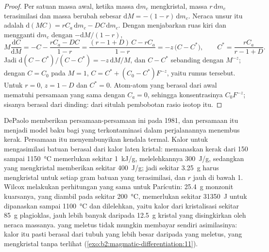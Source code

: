 \begin{proof}
Per satuan massa awal, ketika massa $\mathrm dm_c$ mengkristal, massa
$r\,\mathrm dm_c$ terasimilasi dan massa  berubah sebesar $\mathrm dM =
-(1-r)\,\mathrm dm_c$. Neraca unsur itu adalah $\mathrm d(MC) = rC_a\,\mathrm dm_c -
DC\,\mathrm dm_c$. Dengan menjabarkan ruas kiri dan mengganti $\mathrm dm_c$ dengan
$-\mathrm dM/(1-r)$,
\[
M\frac{\mathrm dC}{\mathrm dM} = -C - \frac{rC_a - DC}{1-r}
= \frac{(r - 1 + D)\,C - rC_a}{1 - r} = -z\,\bigl(C - C^*\bigr),
\qquad C^* = \frac{rC_a}{r - 1 + D}.
\]
Jadi $\mathrm d(C - C^*)/(C - C^*) = -z\,\mathrm dM/M$, dan $C - C^*$ sebanding
dengan $M^{-z}$; dengan $C = C_0$ pada $M = 1$, $C = C^* + (C_0 - C^*)F^{-z}$, yaitu
rumus tersebut. Untuk $r = 0$, $z = 1 - D$ dan $C^* = 0$. Atom-atom yang berasal dari
 awal mematuhi persamaan yang sama dengan $C_a = 0$, sehingga konsentrasinya
$C_0F^{-z}$; sisanya berasal dari dinding: dari situlah pembobotan rasio isotop itu.
\end{proof}

DePaolo memberikan persamaan-persamaan ini pada 1981, dan persamaan itu menjadi model baku bagi 
yang terkontaminasi dalam perjalanannya menembus kerak. Persamaan itu menyembunyikan kendala termal. Kalor
untuk mengasimilasi batuan berasal dari kalor laten kristal: memanaskan kerak dari
150 sampai \qty{1150}{\celsius} memerlukan sekitar \qty{1}{kJ/g}, melelehkannya \qty{300}{J/g},
sedangkan  yang mengkristal memberikan sekitar \qty{400}{J/g}; jadi sekitar \qty{3.25}{g}
 harus mengkristal untuk setiap gram batuan yang terasimilasi, dan $r$ jauh di bawah 1.
Wilcox melakukan perhitungan yang sama untuk Parícutin: \qty{25.4}{g} monzonit
kuarsanya, yang diambil pada sekitar \qty{200}{\celsius}, memerlukan sekitar \qty{31350}{J} untuk
dipanaskan sampai \qty{1100}{\celsius} dan dilelehkan, yaitu kalor dari kristalisasi sekitar
\qty{85}{g} plagioklas, jauh lebih banyak daripada \qty{12.5}{g} kristal yang disingkirkan oleh neraca
massanya.  yang meletus tidak mungkin membayar sendiri asimilasinya:
kalor itu pasti berasal dari tubuh  yang lebih besar daripada yang meletus, yang
mengkristal tanpa terlihat (\cref{exo:b2:magmatic-differentiation:11}).

